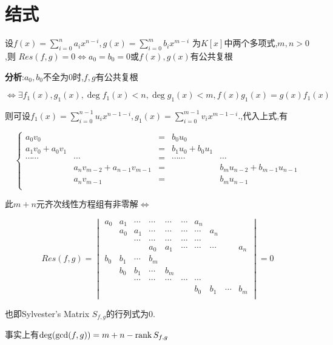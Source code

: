 \section{结式}
设$ f(x)=\sum_{i=0}^{n}{a_ix^{n-i}},g(x)=\sum_{i=0}^{m}{b_ix^{m-i}}$
为$ K[x]$中两个多项式,$ m,n>0$,则
$ Res(f,g)=0\Leftrightarrow a_0=b_0=0$或$ f(x),g(x)$有公共复根

{\bf 分析}:$ a_0,b_0$不全为0时,$ f,g$有公共复根

$ \Leftrightarrow \exists f_1(x),g_1(x),\deg f_1(x)<n,\deg g_1(x)<m,f(x)g_1(x)=g(x)f_1(x)$

则可设$ f_1(x)=\sum_{i=0}^{n-1}{u_ix^{n-1-i}},g_1(x)=\sum_{i=0}^{m-1}{v_ix^{m-1-i}}.$,代入上式,有

\[ \left \{  \begin{array}{lrclr}
a_0v_0		&			&= &b_0u_0		&		\\
a_1v_0+a_0v_1&			&= &b_1u_0+b_0u_1&		\\
\cdots \cdots &\cdots	&= & \cdots\cdots &\cdots		\\
		&{a_nv_{m-2}+a_{n-1}v_{m-1}}&=&		&b_mu_{n-2}+b_{m-1}u_{n-1}\\
		& a_nv_{m-1}&= &				&b_mu_{n-1}\\
\end{array}\right . \]

此$ m+n$元齐次线性方程组有非零解$ \Leftrightarrow $

\[Res(f,g)= \begin{vmatrix}
a_0 & a_1 & \cdots & \cdots & \cdots & \cdots & a_n		&		&	&   \\
	& a_0 & a_1	   & \cdots & \cdots & \cdots & \cdots  &a_n   &	&	\\
	&	  & \cdots & \cdots & \cdots & \cdots & \cdots &		&	&	\\
	&	  &		   & a_0	& a_1	 & \cdots & \cdots & \cdots &	& a_n\\
b_0 & b_1 & \cdots & b_m	&		 &		  &		   &		&	&   \\
	& b_0 & b_1	   & \cdots  &b_m   &	    	&		&		&	&	\\
	&	  & \cdots & \cdots & \cdots & \cdots & \cdots &		&	&	\\
	&	  &		   &		&		&		& b_0		& b_1	& \cdots & b_m\\
\end{vmatrix} =0\]

也即Sylvester's Matrix $ S_{f,g}$的行列式为0.

事实上有$ \deg ( \gcd (f,g) )=m+n-\operatorname{\tiny{rank}} S_{f,g}$ 
\\
